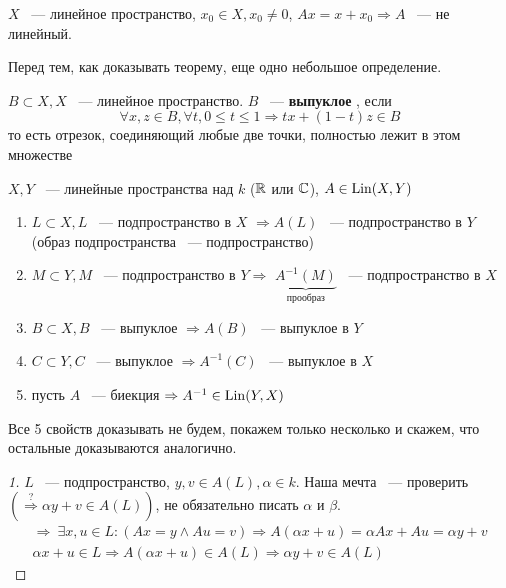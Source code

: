 \documentclass[document]{subfiles}
\begin{document}
\begin{example}
    $X$ ~--- линейное пространство, $x_0 \in X, x_0 \ne 0$, $Ax = x + x_0 \Rightarrow A$ ~--- не линейный.
\end{example}
 
Перед тем, как доказывать теорему, еще одно небольшое определение.
\begin{definition}
    $B \subset X, X$ ~--- линейное пространство. $B$ ~--- \textbf{ выпуклое }, если 
    \[ \forall x,z \in B, \forall t, 0 \leq t \leq 1 \Rightarrow tx + (1-t)z \in B \]
    то есть отрезок, соединяющий любые две точки, полностью лежит в этом множестве
\end{definition}
 
\begin{theorem}
    $X,Y$ ~--- линейные пространства над $k$ ($\mathbb{R}$ или $\mathbb{C}$), $A \in \operatorname{Lin}(X,Y)$
    \begin{enumerate}
        \item $L \subset X, L$ ~--- подпространство в $X$ $\Rightarrow A(L)$ ~--- подпространство в $Y$ (образ подпространства ~--- подпространство)
        \item $M \subset Y, M$ ~--- подпространство в $Y \Rightarrow$ $\underbrace{A^{-1}(M)}_{\text{прообраз}}$ ~--- подпространство в $X$
        \item $B \subset X, B$ ~--- выпуклое $\Rightarrow A(B)$ ~--- выпуклое в $Y$
        \item $C \subset Y, C$ ~--- выпуклое $\Rightarrow A^{-1}(C)$ ~--- выпуклое в $X$
        \item пусть $A$ ~--- биекция $\Rightarrow A^{-1} \in \operatorname{Lin}(Y,X)$
    \end{enumerate}
\end{theorem}
Все 5 свойств доказывать не будем, покажем только несколько и скажем, что остальные доказываются аналогично.
\begin{proof}[1]
    $L$ ~--- подпространство, $y,v \in A(L), \alpha \in k$. Наша мечта ~--- проверить $(\stackrel{?}{\Rightarrow} \alpha y + v \in A(L))$, не обязательно писать $\alpha$ и $\beta$.
    \begin{gather*}
        \Rightarrow \: \exists x,u \in L : (Ax = y \land Au = v) \Rightarrow A(\alpha x + u) = \alpha A x + A u = \alpha y + v \\
        \alpha x + u \in L \Rightarrow A(\alpha x + u) \in A(L) \Rightarrow \alpha y + v \in A(L)
    \end{gather*}
\end{proof}
 
\end{document}
